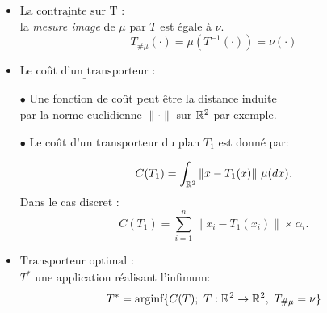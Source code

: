 \documentclass{beamer}
\theoremstyle{definition}
\begin{document}
\begin{frame}
	\begin{itemize}
		\item $\underline{\text{La contrainte sur T}}$ :\\
		 la \emph{mesure image} de $\mu$ par $T$ est égale à $\nu$. 
			$$ T_{\#\mu}(\cdot) = \mu(T^{-1}(\cdot)) = \nu(\cdot)$$
		\item $\underline{\text{Le coût d'un transporteur}}$ :  
	\end{itemize}\begin{itemize}
	\item[$\bullet$] Une fonction de coût peut être la distance induite\\
	 par la norme euclidienne $\|\cdot\|$ sur $\mathbb{R}^2$ par exemple.
	\item[$\bullet$] Le coût d'un transporteur du plan $T_1$ est donné par:
	
	$$C(T_1) = \int_{\R^2}\|x -T_1 (x)\| \ \mu(dx).$$
	Dans le cas discret :
	$$C(T_1) = \sum_{i=1}^{n}\|x_i -T_1 (x_i)\| \times \alpha_i.$$ 
	
	\item $\underline{\text{Transporteur optimal}}$ :\\
	$T^*$ une application réalisant l'infimum:
	$$T^* = \text{arginf}\{C(T ); \ T : \mathbb{R}^2 \to \mathbb{R}^2 , \ T_{\#\mu} = \nu\}$$
\end{itemize}
	
\end{frame}
\end{document}
